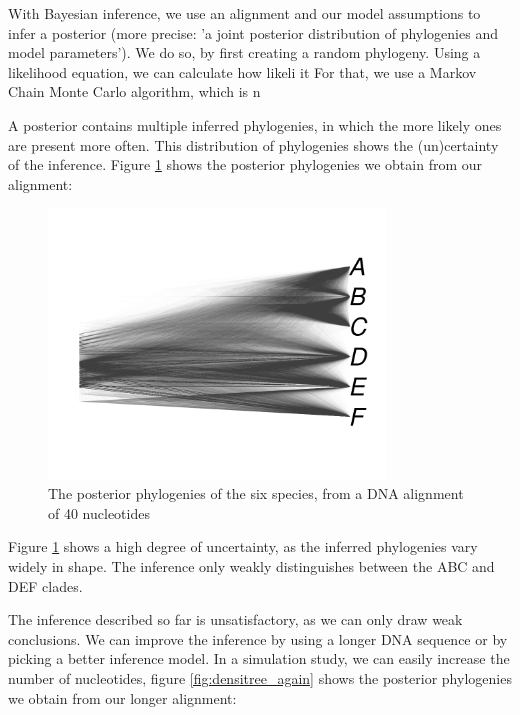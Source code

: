With Bayesian inference, we use an alignment and our model assumptions to infer 
a posterior (more 
precise: 'a joint posterior distribution of phylogenies and model parameters').
We do so, by first creating a random phylogeny. Using a likelihood equation,
we can calculate how likeli it  
For that, we use a Markov Chain Monte Carlo algorithm, which is n 


A posterior contains multiple inferred phylogenies, in which the more likely
ones are present more often. This distribution of phylogenies shows the
(un)certainty of the inference. Figure \ref{fig:densitree} shows the
posterior phylogenies we obtain from our alignment:

\begin{figure}[H]
  \includegraphics[width=0.8\textwidth]{densitree_40.png}
  \caption{
    The posterior phylogenies of the six species, 
    from a DNA alignment of 40 nucleotides
  }
  \label{fig:densitree}
\end{figure}

Figure \ref{fig:densitree} shows a high degree of uncertainty, as the
inferred phylogenies vary widely in shape. The inference only
weakly distinguishes between the ABC and DEF clades. 

The inference described so far is unsatisfactory, as we can only draw 
weak conclusions. We can improve the inference by using a longer DNA sequence 
or by picking a better inference model. In a simulation study, we can
easily increase the number of nucleotides, 
figure \ref{fig:densitree_again} shows the
posterior phylogenies we obtain from our longer alignment:

